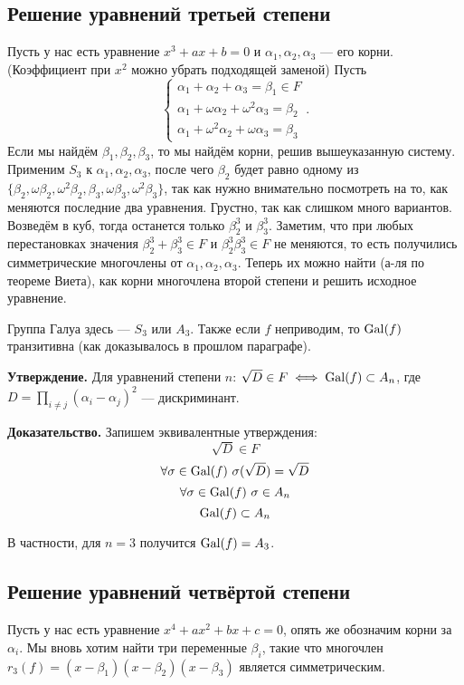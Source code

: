 \subsection{Решение уравнений третьей степени}
Пусть у нас есть уравнение $x^3 + ax + b = 0$ и $\alpha_1, \alpha_2, \alpha_3$ --- его корни.
(Коэффициент при $x^2$ можно убрать подходящей заменой)
Пусть
\[
    \begin{cases}
        \alpha_1 + \alpha_2 + \alpha_3 = \beta_1 \in F \\
        \alpha_1 + \omega \alpha_2 + \omega^2 \alpha_3 = \beta_2 \\
        \alpha_1 + \omega^2 \alpha_2 + \omega \alpha_3 = \beta_3
    \end{cases}
    .
\]
Если мы найдём $\beta_1, \beta_2, \beta_3$, то мы найдём корни, решив вышеуказанную систему.
Применим $S_3$ к $\alpha_1, \alpha_2, \alpha_3$, после чего $\beta_2$ будет равно одному из $\{\beta_2, \omega \beta_2, \omega^2 \beta_2, \beta_3, \omega \beta_3, \omega^2 \beta_3\}$, так как нужно внимательно посмотреть на то, как меняются последние два уравнения.
Грустно, так как слишком много вариантов.
Возведём в куб, тогда останется только $\beta_2^3$ и $\beta_3^3$.
Заметим, что при любых перестановках значения $\beta_2^3 + \beta_3^3 \in F$ и $\beta_2^3 \beta_3^3 \in F$ не меняются, то есть получились симметрические многочлены от $\alpha_1, \alpha_2, \alpha_3$.
Теперь их можно найти (а-ля по теореме Виета), как корни многочлена второй степени и решить исходное уравнение.

Группа Галуа здесь --- $S_3$ или $A_3$.
Также если $f$ неприводим, то $\operatorname{Gal}(f)$ транзитивна (как доказывалось в прошлом параграфе).

\textbf{Утверждение.} Для уравнений степени $n$: $\sqrt D \in F \iff \operatorname{Gal}(f) \subset A_n$, где $D = \prod_{i \ne j} (\alpha_i - \alpha_j)^2$ --- дискриминант.

\textbf{Доказательство.} Запишем эквивалентные утверждения:
\[
    \sqrt D \in F
\]
\[
    \forall \sigma \in \operatorname{Gal}(f)~\sigma(\sqrt D) = \sqrt D
\]
\[
    \forall \sigma \in \operatorname{Gal}(f)~\sigma \in A_n
\]
\[
    \operatorname{Gal}(f) \subset A_n
\]

\QED

В частности, для $n = 3$ получится $\operatorname{Gal}(f) = A_3$.

\subsection{Решение уравнений четвёртой степени}
Пусть у нас есть уравнение $x^4 + ax^2 + bx + c = 0$, опять же обозначим корни за $\alpha_i$.
Мы вновь хотим найти три переменные $\beta_i$, такие что многочлен $r_3(f) = (x - \beta_1)(x - \beta_2)(x - \beta_3)$ является симметрическим.

